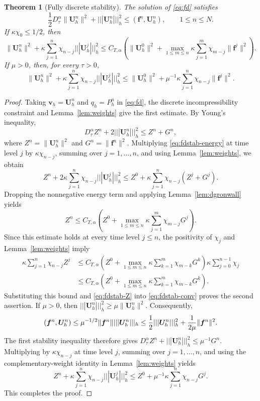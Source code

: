 \documentclass[11pt,a4paper]{article}
\numberwithin{equation}{section}
\theoremstyle{plain}
\newtheorem{theorem}{Theorem}[section]
\theoremstyle{definition}
\theoremstyle{remark}
\newcommand{\nrm}[1]{|||#1|||_h}      %
\newcommand{\Dt}{D_\tau^{\alpha}}     %
\begin{document}



\begin{theorem}[Fully discrete stability]
\label{thm:fdstab}
The solution of \eqref{eq:fd} satisfies
\[
\frac12\Dt\|\bm U_h^n\|^2
+\nrm{\bm U_h^n}^2
\le(\bm f^n,\bm U_h^n),
\qquad 1\le n\le N.
\]
If $\kappa\chi_0\le1/2$, then
\[
\|\bm U_h^n\|^2
+\kappa\sum_{j=1}^n
\chi_{n-j}\nrm{\bm U_h^j}^2
\le C_{T,\alpha}
\left(
\|\bm U_h^0\|^2
+\max_{1\le m\le n}
\kappa\sum_{j=1}^m
\chi_{m-j}\|\bm f^j\|^2
\right).
\]
If $\mu>0$, then, for every $\tau>0$,
\[
\|\bm U_h^n\|^2
+\kappa\sum_{j=1}^n
\chi_{n-j}\nrm{\bm U_h^j}^2\le
\|\bm U_h^0\|^2
+\mu^{-1}\kappa\sum_{j=1}^n
\chi_{n-j}\|\bm f^j\|^2.
\]
\end{theorem}

\begin{proof}
Taking $\bm v_h=\bm U_h^n$ and $q_h=P_h^n$
in \eqref{eq:fd}, the discrete incompressibility
constraint and Lemma~\ref{lem:weights} give the first estimate.
By Young's inequality,
\begin{equation}\label{eq:fdstab-energy}
\Dt Z^n+2\nrm{\bm U_h^n}^2
\le Z^n+G^n,
\end{equation}
where
$Z^n=\|\bm U_h^n\|^2$ and $G^n=\|\bm f^n\|^2.$
Multiplying \eqref{eq:fdstab-energy} at time level
$j$ by $\kappa\chi_{n-j}$, summing over
$j=1,\ldots,n$, and using Lemma~\ref{lem:weights},
we obtain
\begin{equation}\label{eq:fdstab-conv}
Z^n+2\kappa\sum_{j=1}^n
\chi_{n-j}\nrm{\bm U_h^j}^2
\le Z^0+\kappa\sum_{j=1}^n
\chi_{n-j}(Z^j+G^j).
\end{equation}
Dropping the nonnegative energy term and applying
Lemma~\ref{lem:dgronwall} yields
\begin{equation}\label{eq:fdstab-Z}
Z^n\le C_{T,\alpha}
\left(
Z^0+\max_{1\le m\le n}
\kappa\sum_{j=1}^m\chi_{m-j}G^j
\right).
\end{equation}
Since this estimate holds at every time level
$j\le n$, the positivity of $\chi_j$ and
Lemma~\ref{lem:weights} imply
\[
\begin{aligned}
\kappa\sum_{j=1}^n\chi_{n-j}Z^j
&\le C_{T,\alpha}
\left(
Z^0+\max_{1\le m\le n}
\kappa\sum_{k=1}^m\chi_{m-k}G^k
\right)
\kappa\sum_{j=0}^{n-1}\chi_j\\
&\le C_{T,\alpha}
\left(
Z^0+\max_{1\le m\le n}
\kappa\sum_{k=1}^m\chi_{m-k}G^k
\right).
\end{aligned}
\]
Substituting this bound and \eqref{eq:fdstab-Z}
into \eqref{eq:fdstab-conv} proves the second
assertion.
%
If $\mu>0$, then
$\nrm{\bm U_h^n}^2\ge\mu\|\bm U_h^n\|^2$.
Consequently,
\[
(\bm f^n,\bm U_h^n)
\le\mu^{-1/2}\|\bm f^n\|
\nrm{\bm U_h^n}\\
\le\frac12\nrm{\bm U_h^n}^2
+\frac1{2\mu}\|\bm f^n\|^2.
\]
The first stability inequality therefore gives
$
\Dt Z^n+\nrm{\bm U_h^n}^2
\le\mu^{-1}G^n.
$
Multiplying by $\kappa\chi_{n-j}$ at time
level $j$, summing over $j=1,\ldots,n$, and
using the complementary-weight identity in
Lemma~\ref{lem:weights} yields
\[
Z^n+\kappa\sum_{j=1}^n
\chi_{n-j}\nrm{\bm U_h^j}^2
\le Z^0+\mu^{-1}\kappa\sum_{j=1}^n
\chi_{n-j}G^j.
\]
This completes the proof.
\end{proof}
\end{document}
